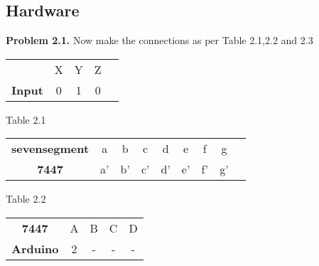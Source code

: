 \documentclass{article}
\begin{document}
\begin{multicols}{2}
\section{Hardware}

\textbf{Problem 2.1.} Now make the connections as per
Table 2.1,2.2 and 2.3 


    \centering
    \begin{tabular}{ |c |c |c |c| c|}

\hline
 \textbf{} & X & Y & Z \\ 
 \textbf{Input} & 0 & 1 & 0\\
  \hline
 \end{tabular}
 Table 2.1



    \centering
    \begin{tabular}{ |c |c |c |c |c |c |c |c |c}

\hline
 \textbf{sevensegment} & a & b  & c & d & e & f & g \\ 
 \textbf{7447} &a'  & b' &c' &d'&e' &f' &g'\\
  \hline
 \end{tabular}
 Table 2.2
 
 
 
    \centering
    \begin{tabular}{ |c |c |c |c| c|}

\hline
 \textbf{7447} & A & B & C & D \\ 
 \textbf{Arduino} &2  &-  &- &- \\
  \hline
 \end{tabular}
 \vspace{3mm}
 

\end{multicols}
\end{document}
